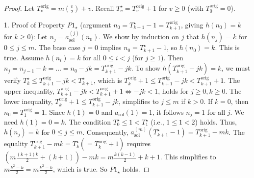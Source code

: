 \documentclass[10pt,a4paper]{amsart}
\begin{document}
\begin{proof}
Let $T_v^{\text{orig}} = m\binom{v}{2}+v$. Recall $T^{\star}_v = T_v^{\text{orig}}+1$ for $v \ge 0$ (with $T_0^{\text{orig}}=0$).

1.  Proof of Property $P1_{\star}$ (argument $n_0 = T^{\star}_{k+1}-1 = T_{k+1}^{\text{orig}}$, giving $h(n_0)=k$ for $k \ge 0$):
    Let $n_j = a_{\text{sol}}^{(j)}(n_0)$. We show by induction on $j$ that $h(n_j)=k$ for $0 \le j \le m$.
    The base case $j=0$ implies $n_0 = T^{\star}_{k+1}-1$, so $h(n_0)=k$. This is true.
    Assume $h(n_i)=k$ for all $0 \le i < j$ (for $j \ge 1$). Then $n_j = n_{j-1}-k = \dots = n_0 - jk = T_{k+1}^{\text{orig}} - jk$.
    To show $h(T_{k+1}^{\text{orig}}-jk)=k$, we must verify $T^{\star}_k \le T_{k+1}^{\text{orig}}-jk < T^{\star}_{k+1}$, which is $T_k^{\text{orig}}+1 \le T_{k+1}^{\text{orig}}-jk < T_{k+1}^{\text{orig}}+1$.
    The upper inequality, $T_{k+1}^{\text{orig}}-jk < T_{k+1}^{\text{orig}}+1 \iff -jk < 1$, holds for $j \ge 0, k \ge 0$.
    The lower inequality, $T_k^{\text{orig}}+1 \le T_{k+1}^{\text{orig}}-jk$, simplifies to $j \le m$ if $k>0$. If $k=0$, then $n_0=T_1^{\text{orig}}=1$. Since $h(1)=0$ and $a_{\text{sol}}(1)=1$, it follows $n_j=1$ for all $j$. We need $h(1)=0=k$. The condition $T_0^{\star} \le 1 < T_1^{\star}$ (i.e., $1 \le 1 < 2$) holds.
    Thus, $h(n_j)=k$ for $0 \le j \le m$.
    Consequently, $a_{\text{sol}}^{(m)}(T^{\star}_{k+1}-1) = T_{k+1}^{\text{orig}} - mk$.
    The equality $T_{k+1}^{\text{orig}} - mk = T^{\star}_k (= T_k^{\text{orig}}+1)$ requires $(m\frac{(k+1)k}{2}+(k+1)) - mk = m\frac{k(k-1)}{2}+k+1$. This simplifies to $m\frac{k^2-k}{2} = m\frac{k^2-k}{2}$, which is true. So $P1_{\star}$ holds.


\end{proof}
\end{document}
